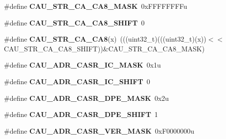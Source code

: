 \begin{DoxyCompactItemize}
\item 
\#define {\bfseries C\+A\+U\+\_\+\+S\+T\+R\+\_\+\+C\+A\+\_\+\+C\+A8\+\_\+\+M\+A\+SK}~0x\+F\+F\+F\+F\+F\+F\+F\+Fu\hypertarget{group__CAU__Register__Masks_ga841925012949d7e6ee56bffe7c3ccc34}{}\label{group__CAU__Register__Masks_ga841925012949d7e6ee56bffe7c3ccc34}

\item 
\#define {\bfseries C\+A\+U\+\_\+\+S\+T\+R\+\_\+\+C\+A\+\_\+\+C\+A8\+\_\+\+S\+H\+I\+FT}~0\hypertarget{group__CAU__Register__Masks_ga7ca88815b2d128a4164b3e14953ed7f2}{}\label{group__CAU__Register__Masks_ga7ca88815b2d128a4164b3e14953ed7f2}

\item 
\#define {\bfseries C\+A\+U\+\_\+\+S\+T\+R\+\_\+\+C\+A\+\_\+\+C\+A8}(x)~(((uint32\+\_\+t)(((uint32\+\_\+t)(x))$<$$<$C\+A\+U\+\_\+\+S\+T\+R\+\_\+\+C\+A\+\_\+\+C\+A8\+\_\+\+S\+H\+I\+FT))\&C\+A\+U\+\_\+\+S\+T\+R\+\_\+\+C\+A\+\_\+\+C\+A8\+\_\+\+M\+A\+SK)\hypertarget{group__CAU__Register__Masks_gace7494bdf03c7abbe72b1f15b8a596ce}{}\label{group__CAU__Register__Masks_gace7494bdf03c7abbe72b1f15b8a596ce}

\item 
\#define {\bfseries C\+A\+U\+\_\+\+A\+D\+R\+\_\+\+C\+A\+S\+R\+\_\+\+I\+C\+\_\+\+M\+A\+SK}~0x1u\hypertarget{group__CAU__Register__Masks_ga5c604aca577b3d7a07e03e6b98ae418f}{}\label{group__CAU__Register__Masks_ga5c604aca577b3d7a07e03e6b98ae418f}

\item 
\#define {\bfseries C\+A\+U\+\_\+\+A\+D\+R\+\_\+\+C\+A\+S\+R\+\_\+\+I\+C\+\_\+\+S\+H\+I\+FT}~0\hypertarget{group__CAU__Register__Masks_ga0659a788cbcc596dc60f7d85104ade27}{}\label{group__CAU__Register__Masks_ga0659a788cbcc596dc60f7d85104ade27}

\item 
\#define {\bfseries C\+A\+U\+\_\+\+A\+D\+R\+\_\+\+C\+A\+S\+R\+\_\+\+D\+P\+E\+\_\+\+M\+A\+SK}~0x2u\hypertarget{group__CAU__Register__Masks_gac2aa12b2fd1060e7b5c444cb64efbcf6}{}\label{group__CAU__Register__Masks_gac2aa12b2fd1060e7b5c444cb64efbcf6}

\item 
\#define {\bfseries C\+A\+U\+\_\+\+A\+D\+R\+\_\+\+C\+A\+S\+R\+\_\+\+D\+P\+E\+\_\+\+S\+H\+I\+FT}~1\hypertarget{group__CAU__Register__Masks_gac342820577edd24d5b9b2ffe7279c18a}{}\label{group__CAU__Register__Masks_gac342820577edd24d5b9b2ffe7279c18a}

\item 
\#define {\bfseries C\+A\+U\+\_\+\+A\+D\+R\+\_\+\+C\+A\+S\+R\+\_\+\+V\+E\+R\+\_\+\+M\+A\+SK}~0x\+F0000000u\hypertarget{group__CAU__Register__Masks_gabb62168b08dff77e1dd30ca4cb6cd997}{}\label{group__CAU__Register__Masks_gabb62168b08dff77e1dd30ca4cb6cd997}


\end{DoxyCompactItemize}

